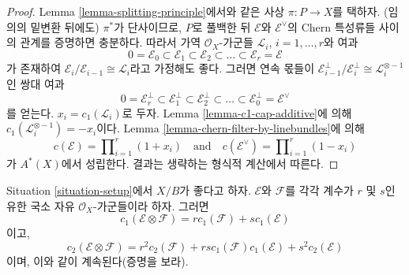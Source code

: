 \begin{proof}
Lemma \ref{lemma-splitting-principle}에서와 같은 사상
$\pi : P \to X$를 택하자. (임의의 밑변환 뒤에도)
$\pi^*$가 단사이므로, $P$로 풀백한 뒤
$\mathcal{E}$와 $\mathcal{E}^\vee$의 Chern 특성류들 사이의
관계를 증명하면 충분하다. 따라서 가역 $\mathcal{O}_X$-가군들
${\mathcal L}_i$, $i = 1, \ldots, r$와 여과
$$
0 = \mathcal{E}_0 \subset \mathcal{E}_1 \subset \mathcal{E}_2
\subset \ldots \subset \mathcal{E}_r = \mathcal{E}
$$
가 존재하여
$\mathcal{E}_i/\mathcal{E}_{i - 1} \cong \mathcal{L}_i$라고
가정해도 좋다. 그러면 연속 몫들이
$\mathcal{E}_{i - 1}^\perp/\mathcal{E}_i^\perp \cong
\mathcal{L}_i^{\otimes -1}$인 쌍대 여과
$$
0 = \mathcal{E}_r^\perp \subset \mathcal{E}_1^\perp \subset \mathcal{E}_2^\perp
\subset \ldots \subset \mathcal{E}_0^\perp = \mathcal{E}^\vee
$$
를 얻는다.
$x_i = c_1(\mathcal{L}_i)$로 두자.
Lemma \ref{lemma-c1-cap-additive}에 의해
$c_1(\mathcal{L}_i^{\otimes -1}) = - x_i$이다.
Lemma \ref{lemma-chern-filter-by-linebundles}에 의해
$$
c(\mathcal{E}) = \prod\nolimits_{i = 1}^r (1 + x_i)
\quad\text{and}\quad
c(\mathcal{E}^\vee) = \prod\nolimits_{i = 1}^r (1 - x_i)
$$
가 $A^*(X)$에서 성립한다. 결과는 생략하는 형식적 계산에서 따른다.
\end{proof}

\begin{lemma}
\label{lemma-chern-classes-tensor-product}
Situation \ref{situation-setup}에서 $X/B$가 좋다고 하자.
$\mathcal{E}$와 $\mathcal{F}$를 각각 계수가 $r$ 및 $s$인 유한 국소 자유
$\mathcal{O}_X$-가군들이라 하자.
그러면
$$
c_1(\mathcal{E} \otimes \mathcal{F})
=
r c_1(\mathcal{F}) + s c_1(\mathcal{E})
$$
이고,
$$
c_2(\mathcal{E} \otimes \mathcal{F})
=
r^2 c_2(\mathcal{F}) +
rs c_1(\mathcal{F})c_1(\mathcal{E}) +
s^2 c_2(\mathcal{E})
$$
이며, 이와 같이 계속된다(증명을 보라).
\end{lemma}

